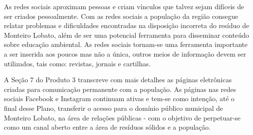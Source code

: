 As redes sociais aproximam pessoas e criam vínculos que talvez sejam difíceis de ser criados pessoalmente. Com as redes sociais a população da região consegue relatar problemas e dificuldades encontradas na disposição incorreta do resíduo de Monteiro Lobato, além de ser uma potencial ferramenta para disseminar conteúdo sobre educação ambiental. As redes sociais tornam-se uma ferramenta importante a ser inserida aos poucos mas não a única, outros meios de informação devem ser utilizados, tais como: revistas, jornais e cartilhas.

A Seção 7 do Produto 3 transcreve com mais detalhes as páginas eletrônicas criadas para comunicação permanente com a população. As páginas nas redes sociais Facebook e Instagram continuam ativas e tem-se como intenção, até o final desse Plano, transferir o acesso para o domínio público municipal de Monteiro Lobato, na área de relações públicas - com o objetivo de perpetuar-se como um canal aberto entre a área de resíduos sólidos e a população.
